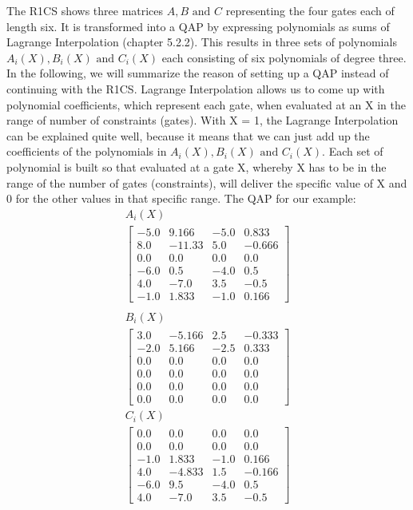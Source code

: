 The R1CS shows three matrices \(A, B \text{ and }C\) representing the four gates each of length six. It is transformed into a QAP by expressing polynomials as sums of Lagrange Interpolation (chapter 5.2.2). This results in three sets of polynomials \(A_i(X), B_i(X) \text{ and }C_i(X)\) each consisting of six polynomials of degree three. In the following, we will summarize the reason of setting up a QAP instead of continuing with the R1CS. Lagrange Interpolation allows us to come up with polynomial coefficients, which represent each gate, when evaluated at an X in the range of number of constraints (gates). With X = 1, the Lagrange Interpolation can be explained quite well, because it means that we can just add up the coefficients of the polynomials in \(A_i(X), B_i(X) \text{ and }C_i(X)\). Each set of polynomial is built so that evaluated at a gate X, whereby X has to be in the range of the number of gates (constraints), will deliver the specific value of X and 0 for the other values in that specific range.\newline
The QAP for our example:
\begin{align*}
    A_i(X) \\
    \begin{bmatrix}
        -5.0 & 9.166 & -5.0 & 0.833 \\
        8.0 & -11.33 & 5.0 & -0.666 \\
        0.0 & 0.0 & 0.0 & 0.0 \\
        -6.0 & 0.5 & -4.0 & 0.5 \\
        4.0 & -7.0 & 3.5 & -0.5 \\
        -1.0 & 1.833 & -1.0 & 0.166
    \end{bmatrix} \\
\end{align*}
\begin{align*}
        B_i(X) \\
    \begin{bmatrix}
        3.0 & -5.166 & 2.5 & -0.333 \\
        -2.0 & 5.166 & -2.5 & 0.333 \\
        0.0 & 0.0 & 0.0 & 0.0 \\
        0.0 & 0.0 & 0.0 & 0.0 \\
        0.0 & 0.0 & 0.0 & 0.0 \\
        0.0 & 0.0 & 0.0 & 0.0
    \end{bmatrix}
\end{align*}
\begin{align*}
        C_i(X) \\
    \begin{bmatrix}
        0.0 & 0.0 & 0.0 & 0.0 \\
        0.0 & 0.0 & 0.0 & 0.0 \\
        -1.0 & 1.833 & -1.0 & 0.166 \\
        4.0 & -4.833 & 1.5 & -0.166 \\
        -6.0 & 9.5 & -4.0 & 0.5 \\
        4.0 & -7.0 & 3.5 & -0.5
    \end{bmatrix}
\end{align*}
